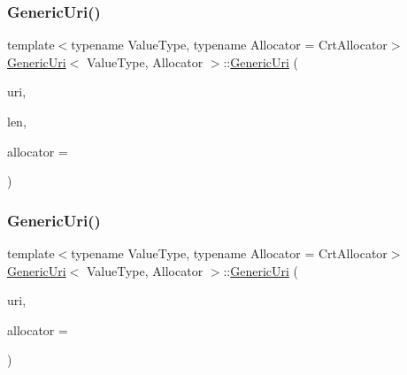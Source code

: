 \subsubsection{\texorpdfstring{Generic\+Uri()}{GenericUri()}\hspace{0.1cm}{\footnotesize\ttfamily [2/6]}}
{\footnotesize\ttfamily template$<$typename Value\+Type, typename Allocator = Crt\+Allocator$>$ \\
\hyperlink{classGenericUri}{Generic\+Uri}$<$ Value\+Type, Allocator $>$\+::\hyperlink{classGenericUri}{Generic\+Uri} (\begin{DoxyParamCaption}\item[{const \hyperlink{classGenericUri_a20d0602cff62211d89bc4b25963beeee}{Ch} $\ast$}]{uri,  }\item[{\hyperlink{rapidjson_8h_a5ed6e6e67250fadbd041127e6386dcb5}{Size\+Type}}]{len,  }\item[{Allocator $\ast$}]{allocator = {} }\end{DoxyParamCaption})\hspace{0.3cm}{\ttfamily [inline]}}

\mbox{\label{classGenericUri_a2077917cd430c4893a3eee2fc5133727}} 
\subsubsection{\texorpdfstring{Generic\+Uri()}{GenericUri()}\hspace{0.1cm}{\footnotesize\ttfamily [3/6]}}
{\footnotesize\ttfamily template$<$typename Value\+Type, typename Allocator = Crt\+Allocator$>$ \\
\hyperlink{classGenericUri}{Generic\+Uri}$<$ Value\+Type, Allocator $>$\+::\hyperlink{classGenericUri}{Generic\+Uri} (\begin{DoxyParamCaption}\item[{const \hyperlink{classGenericUri_a20d0602cff62211d89bc4b25963beeee}{Ch} $\ast$}]{uri,  }\item[{Allocator $\ast$}]{allocator = {} }\end{DoxyParamCaption})\hspace{0.3cm}{\ttfamily [inline]}}

\mbox{\label{classGenericUri_ae0d105ae4ae9a2edc6489835f3bf62a5}} 
